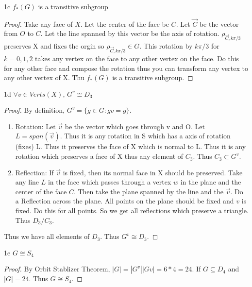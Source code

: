 \documentclass{article}
\begin{document}
\begin{claim}{1c}
    $f_*(G)$ is a transitive subgroup
\end{claim}
\begin{proof}
    Take any face of $X$. Let the center of the face be $C$. Let $\vec{C}$ be the vector from $O$ to $C$. Let the line spanned by this vector be the axis of rotation. $\rho_{\vec{C}, k\pi/3}$ preserves X and fixes the orgin so $\rho_{\vec{C}, k\pi/3} \in G$. This rotation by $k\pi/3$ for $k = 0, 1, 2$ takes any vertex on the face to any other vertex on the face. Do this for any other face and compose the rotation thus you can transform any vertex to any other vertex of X. Thu $f_*(G)$ is a transitive subgroup.
\end{proof}

\begin{claim}{1d}
    $\forall v \in Verts(X)$, $G^v \cong D_3$
\end{claim}
\begin{proof}
    By definition, $G^v = \{g \in G : gv = g\}$. 

    \begin{enumerate}{}
        \item Rotation: Let $\vec{v}$ be the vector which goes through v and O. Let $L = span(\vec{v})$. Thus it is any rotation in S which has a axis of rotation (fixes) L. Thus it preserves the face of X which is normal to L. Thus it is any rotation which preserves a face of X thus any element of $C_3$. Thus $C_3 \subset G^v$.
        \item Reflection: If $\vec{v}$ is fixed, then its normal face in X should be preserved. Take any line $L$ in the face which passes through a vertex $w$ in the plane and the center of the face $C$. Then take the plane spanned by the line and the $\vec{v}$. Do a Reflection across the plane. All points on the plane should be fixed and $v$ is fixed. Do this for all points. So we get all reflections which preserve a triangle. Thus $D_3/C_3$.
    \end{enumerate}

    Thus we have all elements of $D_3$. Thus $G^v \cong D_3$.
\end{proof}

\begin{claim}{1e}
    $G \cong S_4$
\end{claim}
\begin{proof}
    By Orbit Stablizer Theorem, $|G| = |G^v| |Gv| = 6 * 4 = 24$. If $G \subseteq D_4$ and $|G| = 24$. Thus $G \cong S_4$.
\end{proof}
\end{document}
